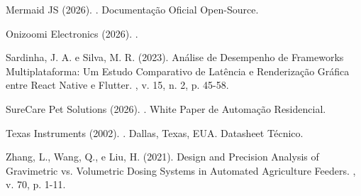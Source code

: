 \documentclass[12pt]{article}\usepackage{sbc-template}\usepackage{graphicx,url}\usepackage[utf8]{inputenc}
\begin{document}
\begin{thebibliography}{}
Mermaid JS (2026).
.
\newblock Documentação Oficial Open-Source.

Onizoomi Electronics (2026).
.

Sardinha, J. A. e Silva, M. R. (2023).
\newblock Análise de Desempenho de Frameworks Multiplataforma: Um Estudo Comparativo de Latência e Renderização Gráfica entre React Native e Flutter.
, v. 15, n. 2, p. 45-58.

SureCare Pet Solutions (2026).
.
\newblock White Paper de Automação Residencial.

Texas Instruments (2002).
.
\newblock Dallas, Texas, EUA. Datasheet Técnico.

Zhang, L., Wang, Q., e Liu, H. (2021).
\newblock Design and Precision Analysis of Gravimetric vs. Volumetric Dosing Systems in Automated Agriculture Feeders.
, v. 70, p. 1-11.

\end{thebibliography}
\end{document}
